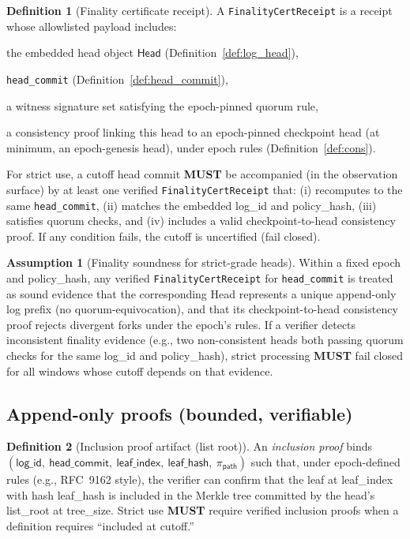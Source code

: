 \documentclass[11pt]{article}
\newcommand{\MUST}{\textbf{MUST}}
\newcommand{\code}[1]{\texttt{#1}}
\newcommand{\term}[1]{\emph{#1}}
\newcommand{\1}{\mathbf{1}}
\theoremstyle{definition}
\newtheorem{definition}{Definition}
\newtheorem{assumption}{Assumption}
\theoremstyle{plain}
\begin{document}
\begin{definition}[Finality certificate receipt]
\label{def:finality_cert}
A \code{FinalityCertReceipt} is a receipt whose allowlisted payload includes:
\begin{tightitemize}
\item the embedded head object $\textsf{Head}$ (Definition~\ref{def:log_head}),
\item \code{head\_commit} (Definition~\ref{def:head_commit}),
\item a witness signature set satisfying the epoch-pinned quorum rule,
\item a consistency proof linking this head to an epoch-pinned checkpoint head (at minimum, an epoch-genesis head), under epoch rules (Definition~\ref{def:cons}).
\end{tightitemize}
For strict use, a cutoff head commit \MUST{} be accompanied (in the observation surface) by at least one verified \code{FinalityCertReceipt} that:
(i) recomputes to the same \code{head\_commit},
(ii) matches the embedded \textsf{log\_id} and \textsf{policy\_hash},
(iii) satisfies quorum checks, and
(iv) includes a valid checkpoint-to-head consistency proof.
If any condition fails, the cutoff is uncertified (fail closed).
\end{definition}

\begin{assumption}[Finality soundness for strict-grade heads]
\label{ass:finality_sound}
Within a fixed epoch and \textsf{policy\_hash}, any verified \code{FinalityCertReceipt} for \code{head\_commit} is treated as sound evidence that the corresponding \textsf{Head} represents a unique append-only log prefix (no quorum-equivocation), and that its checkpoint-to-head consistency proof rejects divergent forks under the epoch's rules.
If a verifier detects inconsistent finality evidence (e.g., two non-consistent heads both passing quorum checks for the same \textsf{log\_id} and \textsf{policy\_hash}), strict processing \MUST{} fail closed for all windows whose cutoff depends on that evidence.
\end{assumption}


\subsection{Append-only proofs (bounded, verifiable)}

\begin{definition}[Inclusion proof artifact (list root)]
\label{def:incl}
An \term{inclusion proof} binds
$(\textsf{log\_id},\ \textsf{head\_commit},\ \textsf{leaf\_index},\ \textsf{leaf\_hash},\ \pi_{\textsf{path}})$
such that, under epoch-defined rules (e.g., RFC~9162 style), the verifier can confirm that the leaf at \textsf{leaf\_index} with hash \textsf{leaf\_hash} is included in the Merkle tree committed by the head's \textsf{list\_root} at \textsf{tree\_size}. Strict use \MUST{} require verified inclusion proofs when a definition requires ``included at cutoff.''
\end{definition}
\end{document}
